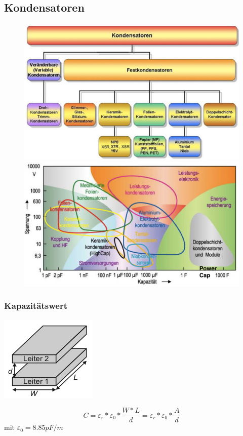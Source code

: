\subsection{Kondensatoren}
\begin{figure}[h]
\includegraphics[scale=0.4]{pictures/kondensatortypen}
\includegraphics[scale=0.4]{pictures/spannungkondensator}
\end{figure}

\subsubsection{Kapazitätswert}
\begin{minipage}{9cm}
\includegraphics[scale=0.8]{pictures/kapazitaetswert}
\end{minipage}
\begin{minipage}{9cm}
\begin{equation}
C=\varepsilon_{r}*\varepsilon_{0}*\frac{W*L}{d}=\varepsilon_{r}*\varepsilon_{0}*\frac{A}{d}
\end{equation}
$\text{mit } \varepsilon_{0}= 8.85 pF/m$
\end{minipage}

